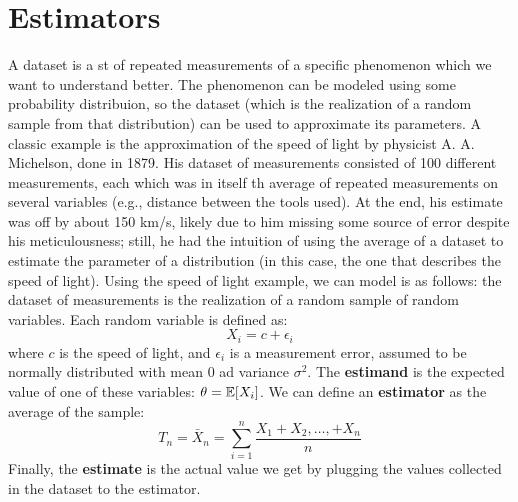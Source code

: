 \section{Estimators}

A dataset is a st of repeated measurements of a specific phenomenon which we want to understand better. The phenomenon can be modeled using some probability distribuion, so the dataset (which is the realization of a random sample from that distribution) can be used to approximate its parameters.
A classic example is the approximation of the speed of light by physicist A. A. Michelson, done in 1879. His dataset of measurements consisted of 100 different measurements, each which was in itself th average of repeated measurements on several variables (e.g., distance between the tools used). At the end, his estimate was off by about 150 km/s, likely due to him missing some source of error despite his meticulousness; still, he had the intuition of using the average of a dataset to estimate the parameter of a distribution (in this case, the one that describes the speed of light).
Using the speed of light example, we can model is as follows: the dataset of measurements is the realization of a random sample of random variables. Each random variable is defined as:
\[X_i = c + \epsilon_i\]
where $c$ is the speed of light, and $\epsilon_i$ is a measurement error, assumed to be normally distributed with mean 0 ad variance $\sigma^2$. The \textbf{estimand} is the expected value of one of these variables: $\theta = \mathbb{E}[X_i]$. We can define an \textbf{estimator} as the average of the sample:
\[T_n = \bar{X}_n = \sum_{i=1}^n \frac{X_1 + X_2, \ldots, + X_n}{n}\]
Finally, the \textbf{estimate} is the actual value we get by plugging the values collected in the dataset to the estimator.

